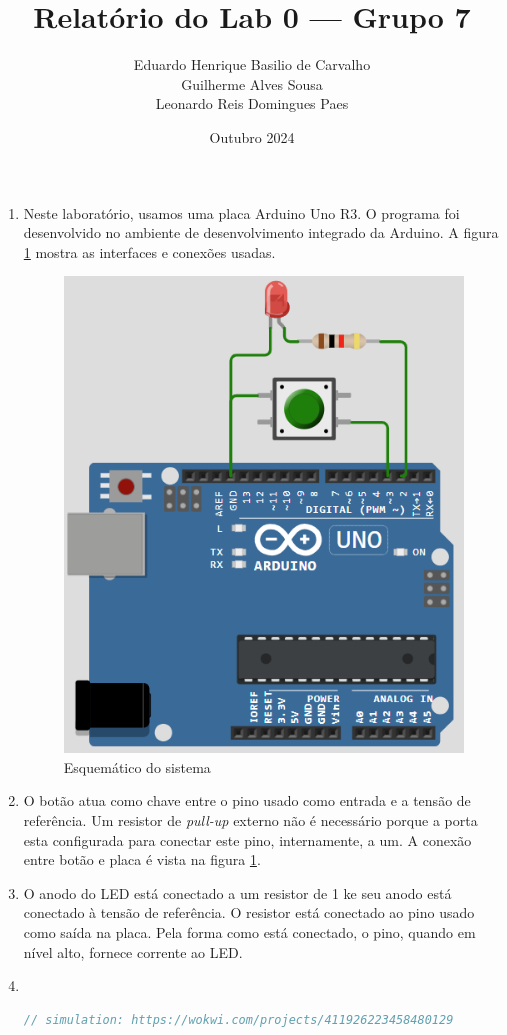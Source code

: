 \documentclass{article}
\title{Relatório do Lab 0 — Grupo 7}
\author{Eduardo Henrique Basilio de Carvalho \\
        Guilherme Alves Sousa \\
        Leonardo Reis Domingues Paes}
\date{Outubro 2024}
\begin{document}
\maketitle
\pagebreak

\begin{enumerate}
    \item Neste laboratório, usamos uma placa Arduino Uno R3. O programa foi desenvolvido no ambiente de desenvolvimento integrado da Arduino. A figura \ref{fig:esquematico} mostra as interfaces e conexões usadas.
    \begin{figure}[H]
        \centering
        \includegraphics[width=0.5\linewidth]{esquematico.png}
        \caption{Esquemático do sistema}
        \label{fig:esquematico}
    \end{figure}

    \item O botão atua como chave entre o pino usado como entrada e a tensão de referência. Um resistor de \textit{pull-up} externo não é necessário porque a porta esta configurada para conectar este pino, internamente, a um. A conexão entre botão e placa é vista na figura \ref{fig:esquematico}.

    \item O anodo do LED está conectado a um resistor de 1 k\textohm e seu anodo está conectado à tensão de referência. O resistor está conectado ao pino usado como saída na placa. Pela forma como está conectado, o pino, quando em nível alto, fornece corrente ao LED.

    \item \ \\
\begin{lstlisting}[breaklines=true, language=C++]
// simulation: https://wokwi.com/projects/411926223458480129


\end{lstlisting}
\end{enumerate}
\end{document}
